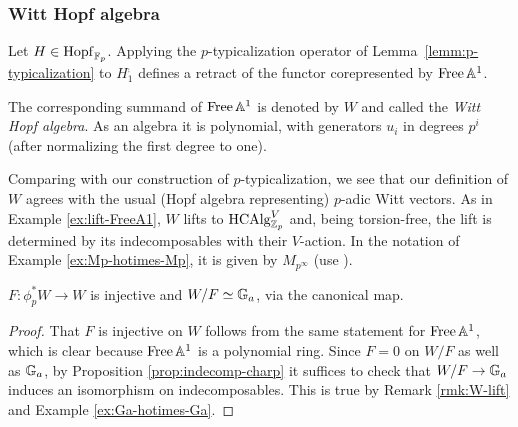 \subsubsection{Witt Hopf algebra} \label{app:rw-witt-hopf}
Let $H\in\mathrm{Hopf}_{\mathbb{F}_p}$. Applying the $p$-typicalization operator of Lemma~\ref{lemm:p-typicalization} to $H^\comp_1$ defines a retract of the functor corepresented by $\operatorname{Free}\mathbb A^1$.
\begin{definition}\label{def:W}
The corresponding summand of $\operatorname{Free}\mathbb A^1$ is denoted by $W$ and called the \emph{Witt Hopf algebra}. As an algebra it is polynomial, with generators $u_i$ in degrees $p^i$ (after normalizing the first degree to one).
\end{definition}

\begin{remark} \label{rmk:W-lift}
Comparing \cite[Theorem 14.21]{hazewinkel-witt-vectors} with our construction of $p$-typicalization, we see that our definition of $W$ agrees with the usual (Hopf algebra representing) $p$-adic Witt vectors.
As in Example \ref{ex:lift-FreeA1}, $W$ lifts to $\mathrm{HCAlg}_{\mathbb{Z}_p}^V$ and, being torsion-free, the lift is determined by its indecomposables with their $V$-action.
In the notation of Example \ref{ex:Mp-hotimes-Mp}, it is given by $M_{p^\infty}$ (use \cite[\S14.8, (13.4)]{hazewinkel-witt-vectors}).
\end{remark}

\begin{lemma} \label{lemm:W-mod-F}
$F: \phi_p^* W \to W$ is injective and $W/F \simeq {\mathbb G}_a$, via the canonical map.
\end{lemma}
\begin{proof}
That $F$ is injective on $W$ follows from the same statement for $\operatorname{Free}\mathbb A^1$, which is clear because $\operatorname{Free}\mathbb A^1$ is a polynomial ring.
Since $F=0$ on $W/F$ as well as ${\mathbb G}_a$, by Proposition \ref{prop:indecomp-charp} it suffices to check that $W/F \to {\mathbb G}_a$ induces an isomorphism on indecomposables.
This is true by Remark \ref{rmk:W-lift} and Example \ref{ex:Ga-hotimes-Ga}.
\end{proof}

